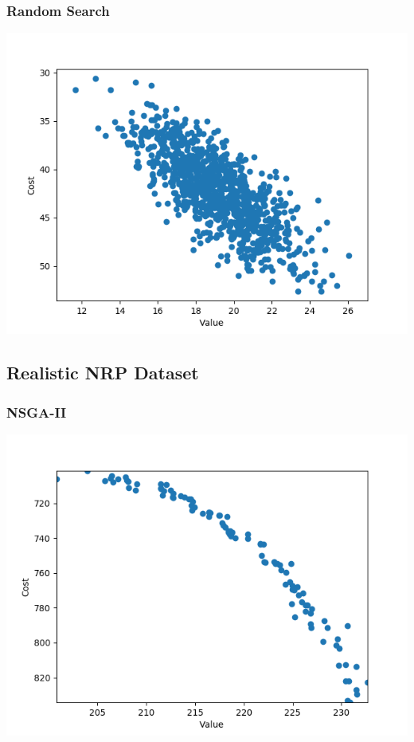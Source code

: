 \documentclass[12pt]{article}
\begin{document}
\subsubsection{Random Search}
\includegraphics[width=\linewidth]{res/random.png}

\subsection{Realistic NRP Dataset}
\subsubsection{NSGA-II}
\includegraphics[width=\linewidth]{res/multi_obj_real.png}
\end{document}
